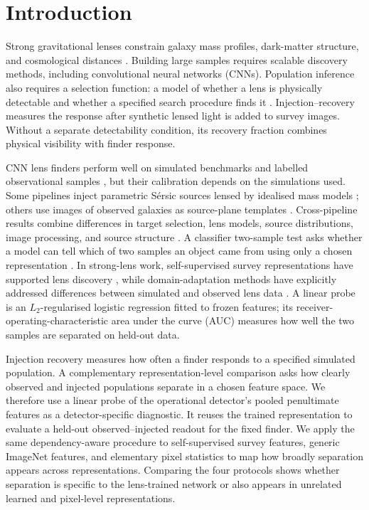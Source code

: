 \section{Introduction}

Strong gravitational lenses constrain galaxy mass profiles, dark-matter
structure, and cosmological distances \citep[e.g.][]{Treu2010,Collett2015}.
Building large samples requires scalable discovery methods, including
convolutional neural networks (CNNs). Population inference also requires a
selection function: a model of whether a lens is physically detectable and
whether a specified search procedure finds it
\citep{Sonnenfeld2023,Sonnenfeld2024}. Injection--recovery measures the
response after synthetic lensed light is added to survey images. Without a
separate detectability condition, its recovery fraction combines physical
visibility with finder response.

CNN lens finders perform well on simulated benchmarks and labelled
observational samples \citep[e.g.][]{Petrillo2017,Lanusse2018,Jacobs2019,
Canameras2021,Storfer2024}, but their calibration depends on the simulations
used. Some pipelines inject parametric S\'{e}rsic sources lensed by idealised
mass models \citep[e.g.][]{Herle2024}; others use images of observed galaxies
as source-plane templates \citep[e.g.][]{Canameras2021,Rojas2022,Schuldt2023}.
Cross-pipeline results combine differences in target selection, lens models,
source distributions, image processing, and source structure
\citep{Jaelani2024,Canameras2024}. A classifier two-sample test
asks whether a model can tell which of two samples an object came from using
only a chosen representation \citep{LopezPazOquab2017}. In strong-lens work,
self-supervised survey representations have supported lens discovery
\citep{Stein2022}, while domain-adaptation methods have explicitly addressed
differences between simulated and observed lens data \citep{Parul2025}.
A linear probe is an \(L_2\)-regularised logistic regression fitted to frozen
features; its receiver-operating-characteristic area under the curve (AUC)
measures how well the two samples are separated on held-out data.

Injection recovery measures how often a finder responds to a specified
simulated population. A complementary representation-level comparison asks
how clearly observed and injected populations separate in a chosen feature
space. We therefore use a linear probe of the operational detector's pooled
penultimate features as a detector-specific diagnostic. It reuses the trained
representation to evaluate a held-out observed--injected readout for the fixed
finder. We
apply the same dependency-aware procedure to self-supervised survey features,
generic ImageNet features, and elementary pixel statistics to map how broadly
separation appears across representations. Comparing the four protocols shows
whether separation is specific to the lens-trained network or also appears in
unrelated learned and pixel-level representations.

